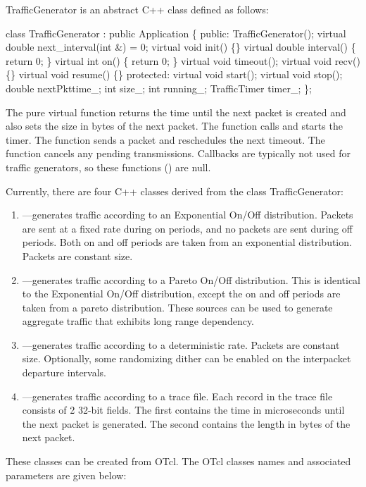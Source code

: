 TrafficGenerator is an abstract C++ class defined as follows:
\begin{program}
        class TrafficGenerator : public Application \{
        public:
                TrafficGenerator();
                virtual double next_interval(int &) = 0;
                virtual void init() \{\}
                virtual double interval() \{ return 0; \}
                virtual int on() \{ return 0; \}
                virtual void timeout();
                virtual void recv() \{\}
                virtual void resume() \{\}
        protected:
                virtual void start();
                virtual void stop();
                double nextPkttime_;
                int size_;
                int running_;
                TrafficTimer timer_;
        \};
\end{program}
The pure virtual function  returns the time until the
next packet is created and also sets the size in bytes of the next
packet.  The function  calls  and starts the 
timer.  The function  sends a packet and reschedules the
next timeout.  The function  cancels any pending transmissions.
Callbacks are typically not used for traffic generators, so these 
functions () are null.

Currently, there are four C++ classes derived from the
class TrafficGenerator:
\begin{enumerate}
\item {}---generates traffic according to an
  Exponential On/Off distribution.
  Packets are sent at a fixed rate during on periods, and
  no packets are sent during off periods.
  Both on and off periods are taken from an exponential distribution.
  Packets are constant size.
\item {}---generates traffic
  according to a Pareto On/Off distribution.
  This is identical to the Exponential On/Off distribution,
  except the on and off periods are taken from a pareto distribution.
  These sources can be used to generate aggregate traffic
  that exhibits long range dependency.
\item {}---generates traffic according to a deterministic rate.
  Packets are constant size.  Optionally, some randomizing dither can be
  enabled on the interpacket departure intervals. 
\item {}---generates traffic according to a trace file.
  Each record in the trace file consists of 2 32-bit fields.
  The first contains the time in microseconds
  until the next packet is generated.
  The second contains the length in bytes of the next packet.
\end{enumerate}
These classes can be created from OTcl.  The OTcl classes names and
associated parameters are given below:

